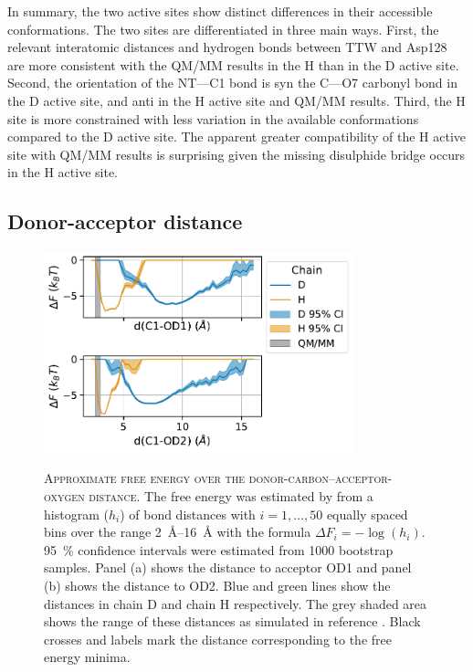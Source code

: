 In summary, the two active sites show distinct differences in their accessible conformations.  The two sites are differentiated in three main ways. First, the relevant interatomic distances and hydrogen bonds between TTW and Asp128 are more consistent with the QM/MM results in the H than in the D active site. Second, the orientation of the NT---C1 bond is syn the C---O7 carbonyl bond in the D active site, and anti in the H active site and QM/MM results. Third, the H site is more constrained with less variation in the available conformations compared to the  D active site. The apparent greater compatibility of the H active site with QM/MM results is surprising given the missing disulphide bridge occurs in the H active site.

\subsection{Donor-acceptor distance}


\begin{figure}
    \centering
    \caption[Approximate free energy over the donor-carbon--acceptor-oxygen distance]{\textsc{Approximate free energy over the donor-carbon--acceptor-oxygen distance}. The free energy was estimated by from a histogram ($h_{i}$) of bond distances with $i = 1, \ldots, 50$ equally spaced bins over the range \SIrange{2}{16}{\angstrom} with the formula $\Delta F_{i} = -\log{(h_{i})}$. \SI{95}{\percent} confidence intervals were estimated from \num{1000} bootstrap samples. Panel (a) shows the distance to acceptor OD1 and panel (b) shows the distance to OD2. Blue and green lines show the distances in chain D and chain H respectively. The grey shaded area shows the range of these distances as simulated in reference \cite{ranaghanInitioQMMM2017}. Black crosses and labels mark the distance corresponding to the free energy minima.}
    \includegraphics[width=0.8\textwidth]{chapters/aadh/figures/dad_free_energy.pdf}
    \label{fig:dad_free_energy}
\end{figure}


